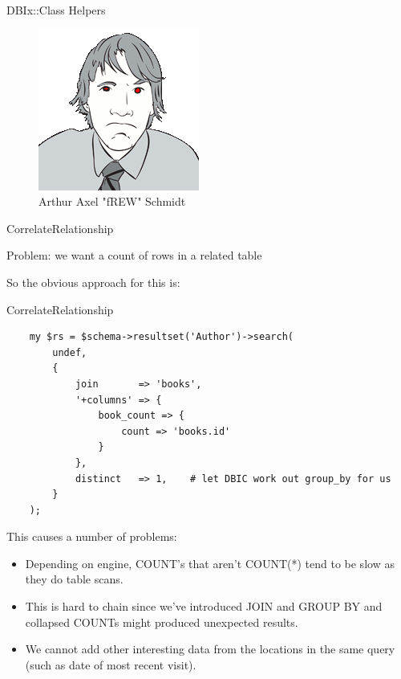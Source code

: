 \begin{frame}{DBIx::Class Helpers}
\begin{figure}[!ht]
\centering
\includegraphics[width=0.4\linewidth]{img/frew.png}
\caption{Arthur Axel "fREW" Schmidt}
\end{figure}
\end{frame}

\begin{frame}{CorrelateRelationship}

Problem: we want a count of rows in a related table

\end{frame}

So the obvious approach for this is:

\begin{frame}[fragile]{CorrelateRelationship}
\begin{lstlisting}
    my $rs = $schema->resultset('Author')->search(
        undef,
        {
            join       => 'books',
            '+columns' => {
                book_count => {
                    count => 'books.id'
                }
            },
            distinct   => 1,    # let DBIC work out group_by for us
        }
    );
\end{lstlisting}
\end{frame}
This causes a number of problems:

\begin{itemize}
\item Depending on engine, COUNT’s that aren’t COUNT(*) tend to be slow as
they do table scans.
\item This is hard to chain since we've introduced JOIN and GROUP BY and
collapsed COUNTs might produced unexpected results.
\item We cannot add other interesting data from the locations in the same query (such as date of most recent visit).
\end{itemize}

